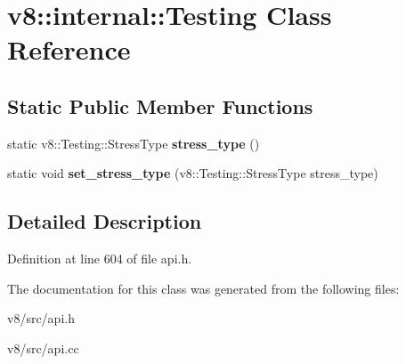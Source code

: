 \hypertarget{classv8_1_1internal_1_1Testing}{}\section{v8\+:\+:internal\+:\+:Testing Class Reference}
\label{classv8_1_1internal_1_1Testing}
\subsection*{Static Public Member Functions}
\begin{DoxyCompactItemize}
\item 
\mbox{\label{classv8_1_1internal_1_1Testing_aac7227aab90d2429d7c31028287c54fe}} 
static v8\+::\+Testing\+::\+Stress\+Type {\bfseries stress\+\_\+type} ()
\item 
\mbox{\label{classv8_1_1internal_1_1Testing_a5416ca263ee9b94dc271e6365185fb5c}} 
static void {\bfseries set\+\_\+stress\+\_\+type} (v8\+::\+Testing\+::\+Stress\+Type stress\+\_\+type)
\end{DoxyCompactItemize}


\subsection{Detailed Description}


Definition at line 604 of file api.\+h.



The documentation for this class was generated from the following files\+:\begin{DoxyCompactItemize}
\item 
v8/src/api.\+h\item 
v8/src/api.\+cc\end{DoxyCompactItemize}

